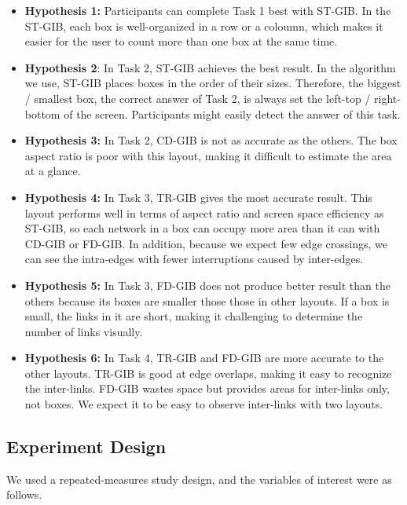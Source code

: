 \documentclass{vgtc}                          %
\begin{document}
\begin{itemize}
\item {\bf Hypothesis 1:} Participants can complete Task 1 best with ST-GIB.
In the ST-GIB, each box is well-organized in a row or a coloumn, which makes it easier for the user to count more than one box at the same time.

\item {\bf Hypothesis 2}: In Task 2, ST-GIB achieves the best result.
In the algorithm we use, ST-GIB places boxes in the order of their sizes. Therefore, the biggest / smallest box, the correct answer of Task 2, is always set the left-top / right-bottom of the screen.
Participants might easily detect the answer of this task.

\item {\bf Hypothesis 3:} In Task 2, CD-GIB is not as accurate as the others.
The box aspect ratio is poor with this layout, making it difficult to estimate the area at a glance.

\item {\bf Hypothesis 4:} In Task 3, TR-GIB gives the most accurate result.
This layout performs well in terms of aspect ratio and screen space efficiency as ST-GIB, so each network in a box can occupy more area than it can with CD-GIB or FD-GIB.
In addition, because we expect few edge crossings, we can see the intra-edges with fewer interruptions caused by inter-edges.

\item {\bf Hypothesis 5:} In Task 3, FD-GIB does not produce better result than the others because its boxes are smaller those those in other layouts.
If a box is small, the links in it are short, making it challenging to determine the number of links visually.

\item {\bf Hypothesis 6:} In Task 4, TR-GIB and FD-GIB are more accurate to the other layouts.
TR-GIB is good at edge overlaps, making it easy to recognize the inter-links.
FD-GIB wastes space but provides areas for inter-links only, not boxes.
We expect it to be easy to observe inter-links with two layouts.
\end{itemize}

\subsection{Experiment Design}

We used a repeated-measures study design, and the variables of interest were as follows.
\end{document}
